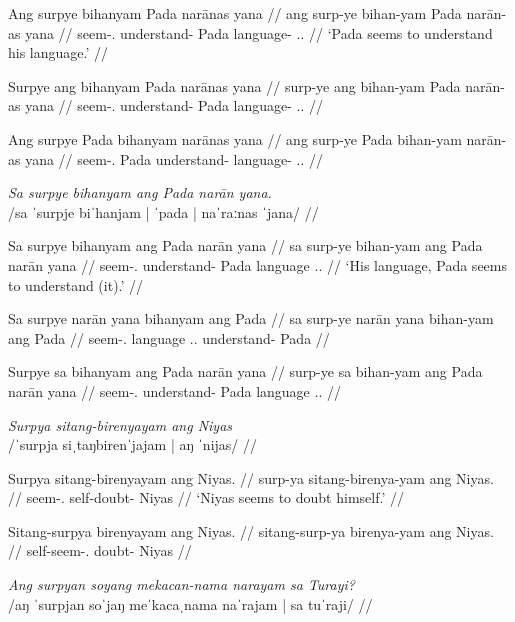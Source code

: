 \documentclass[12pt,a4paper]{scrartcl}
\newcommand{\TsgM}{{\Tsg}.{\M}}
\newcommand{\TsgF}{{\Tsg}.{\F}}
\begin{document}
\gla Ang surpye bihanyam Pada narānas yana //
\glb ang surp-ye bihan-yam Pada narān-as yana //
\glc \AgtT{} seem-\TsgF{} understand-\Ptcp{} Pada language-\Parg{} \TsgM{}.\Gen{} //
\glft `Pada seems to understand his language.' //
\endgl

\a\ljudge*\begingl
\gla Surpye ang bihanyam Pada narānas yana //
\glb surp-ye ang bihan-yam Pada narān-as yana //
\glc seem-\TsgF{} \AgtT{} understand-\Ptcp{} Pada language-\Parg{} \TsgM{}.\Gen{} //
\endgl

\a\ljudge*\begingl
\gla Ang surpye Pada bihanyam narānas yana //
\glb ang surp-ye Pada bihan-yam narān-as yana //
\glc \AgtT{} seem-\TsgF{} Pada understand-\Ptcp{} language-\Parg{} \TsgM{}.\Gen{} //
\endgl
\xe

\pex
\a\begingl
\glpreamble \textit{Sa surpye bihanyam ang Pada narān yana.} \\
	/sa ˈsurpje biˈhanjam | ˈpada | naˈraːnas ˈjana/ //

\gla Sa surpye bihanyam ang Pada narān yana //
\glb sa surp-ye bihan-yam ang Pada narān yana //
\glc \PatT{} seem-\TsgF{} understand-\Ptcp{} \Aarg{} Pada language \TsgM{}.\Gen{} //
\glft `His language, Pada seems to understand (it).' //
\endgl

\a\ljudge*\begingl
\gla Sa surpye narān yana bihanyam ang Pada //
\glb sa surp-ye narān yana bihan-yam ang Pada //
\glc \PatT{} seem-\TsgF{} language \TsgM{}.\Gen{} understand-\Ptcp{} \Aarg{} Pada //
\endgl

\a\ljudge*\begingl
\gla Surpye sa bihanyam ang Pada narān yana //
\glb surp-ye sa bihan-yam ang Pada narān yana //
\glc seem-\TsgF{} \PatT{} understand-\Ptcp{} \Aarg{} Pada language \TsgM{}.\Gen{} //
\endgl
\xe

\pex
\a\begingl
\glpreamble \textit{Surpya sitang-birenyayam ang Niyas} \\
	/ˈsurpja siˌtaŋbirenˈjajam | aŋ ˈnijas/ //

\gla Surpya sitang-birenyayam ang Niyas. //
\glb surp-ya sitang-birenya-yam ang Niyas. //
\glc seem-\TsgM{} self-doubt-\Ptcp{} \Aarg{} Niyas //
\glft `Niyas seems to doubt himself.' //
\endgl

\a\ljudge*\begingl
\gla Sitang-surpya birenyayam ang Niyas. //
\glb sitang-surp-ya birenya-yam ang Niyas. //
\glc self-seem-\TsgM{} doubt-\Ptcp{} \Aarg{} Niyas //
\endgl
\xe

\ex\begingl
\glpreamble \textit{Ang surpyan soyang mekacan-nama narayam sa Turayi?} \\
	/aŋ ˈsurpjan soˈjaŋ meˈkacaˌnama naˈrajam | sa tuˈraji/ //
\end{document}
